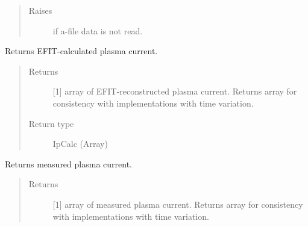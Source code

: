 \documentclass[letterpaper,10pt,english]{sphinxmanual}
\begin{document}
\begin{fulllineitems}
\begin{fulllineitems}
\begin{quote}
\begin{description}
\item[{Raises}] \leavevmode
{} \textendash{} if a-file data is not read.

\end{description}\end{quote}

\end{fulllineitems}


\begin{fulllineitems}
\label{\detokenize{eqtools:eqtools.eqdskreader.EqdskReader.getIpCalc}}
Returns EFIT-calculated plasma current.
\begin{quote}\begin{description}
\item[{Returns}] \leavevmode
{[}1{]} array of EFIT-reconstructed plasma current.
Returns array for consistency with
{\hyperref[\detokenize{eqtools:eqtools.core.Equilibrium}]{}}
implementations with time variation.

\item[{Return type}] \leavevmode
IpCalc (Array)

\end{description}\end{quote}

\end{fulllineitems}


\begin{fulllineitems}
\label{\detokenize{eqtools:eqtools.eqdskreader.EqdskReader.getIpMeas}}
Returns measured plasma current.
\begin{quote}\begin{description}
\item[{Returns}] \leavevmode
{[}1{]} array of measured plasma current.  Returns
array for consistency with
{\hyperref[\detokenize{eqtools:eqtools.core.Equilibrium}]{}}
implementations with time variation.


\end{description}
\end{quote}
\end{fulllineitems}
\end{fulllineitems}
\end{document}
